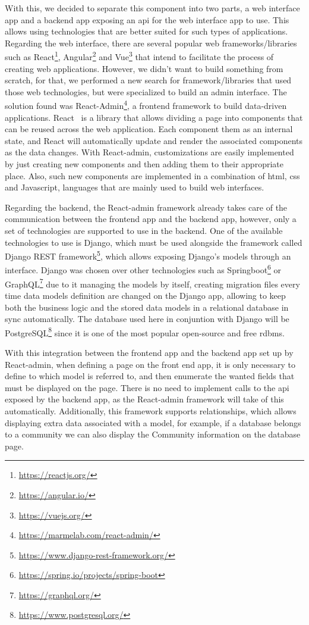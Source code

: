 With this, we decided to separate this component into two parts, a web interface app and a backend app exposing an \gls{api} for the web interface app to use.
This allows using technologies that are better suited for such types of applications.
Regarding the web interface, there are several popular web frameworks/libraries such as React\footnote{\url{https://reactjs.org/}}, Angular\footnote{\url{https://angular.io/}} and Vue\footnote{\url{https://vuejs.org/}} that intend to facilitate the process of creating web applications.
However, we didn't want to build something from scratch, for that, we performed a new search for framework/libraries that used those web technologies, but were specialized to build an admin interface.
The solution found was React-Admin\footnote{\url{https://marmelab.com/react-admin/}}, a frontend framework to build data-driven applications.
React~\cite{react} is a library that allows dividing a page into components that can be reused across the web application.
Each component them as an internal state, and React will automatically update and render the associated components as the data changes.
With React-admin, customizations are easily implemented by just creating new components and then adding them to their appropriate place.
Also, such new components are implemented in a combination of \gls{html}, \gls{css} and Javascript, languages that are mainly used to build web interfaces.

Regarding the backend, the React-admin framework already takes care of the communication between the frontend app and the backend app, however, only a set of technologies are supported to use in the backend.
One of the available technologies to use is Django, which must be used alongside the framework called Django REST framework\footnote{\url{https://www.django-rest-framework.org/}}, which allows exposing Django's models through an interface.
Django was chosen over other technologies such as Springboot\footnote{\url{https://spring.io/projects/spring-boot}} or GraphQL\footnote{\url{https://graphql.org/}} due to it managing the models by itself, creating migration files every time data models definition are changed on the Django app, allowing to keep both the business logic and the stored data models in a relational database in sync automatically.
The database used here in conjuntion with Django will be PostgreSQL\footnote{\url{https://www.postgresql.org/}} since it is one of the most popular open-source and free \gls{rdbms}.

With this integration between the frontend app and the backend app set up by React-admin, when defining a page on the front end app, it is only necessary to define to which model is referred to, and then enumerate the wanted fields that must be displayed on the page.
There is no need to implement calls to the \gls{api} exposed by the backend app, as the React-admin framework will take of this automatically.
Additionally, this framework supports relationships, which allows displaying extra data associated with a model, for example, if a database belongs to a community we can also display the Community information on the database page.

